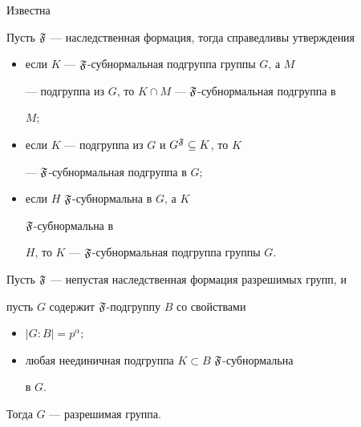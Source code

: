 Известна





\begin{lem}


Пусть $\frak F$ --- наследственная формация, тогда справедливы утверждения


\begin{itemize}


\item[1)] если $K$ --- $\frak F$-субнормальная подгруппа группы $G$, а $M$


--- подгруппа из $G$, то $K\cap M$ --- $\frak F$-субнормальная подгруппа в


$M;$


\item[2)] если $K$ --- подгруппа из $G$ и $G^{\frak F}\subseteq K$, то $K$


--- $\frak F$-субнормальная подгруппа в $G;$


\item[3)] если $H$\; $\frak F$-субнормальна в $G$, а $K$\;


$\frak F$-субнормальна в


$H$, то $K$ --- $\frak F$-субнормальная подгруппа группы $G$.


\end{itemize}


\end{lem}





\begin{lem}


Пусть $\frak F$ --- непустая наследственная формация разрешимых групп, и


пусть $G$ содержит $\frak F$-подгруппу $B$ со свойствами


\begin{itemize}


\item[1)] $|G{:}B|=p^\alpha;$


\item[2)] любая неединичная подгруппа $K\subset B$\; $\frak F$-субнормальна


в $G$.


\end{itemize}


Тогда $G$ --- разрешимая группа.


\end{lem}





